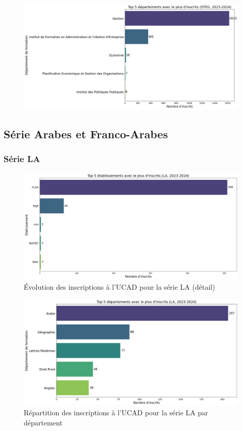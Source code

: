 \begin{figure}[h]
\centering
\includegraphics[width=1\textwidth]{figure/dep_STEG_2024.png}
\end{figure}

\newpage
\subsection{Série Arabes et Franco-Arabes}

\subsubsection{Série LA}
\begin{figure}[h]
\centering
\caption{Évolution des inscriptions à l'UCAD pour la série LA (détail)}
\includegraphics[width=1\textwidth]{figure/etab_LA_2024.png}
\end{figure}

\begin{figure}[h]
\centering
\caption{Répartition des inscriptions à l'UCAD pour la série LA par département}
\includegraphics[width=1\textwidth]{figure/dep_LA_2024.png}
\end{figure}

